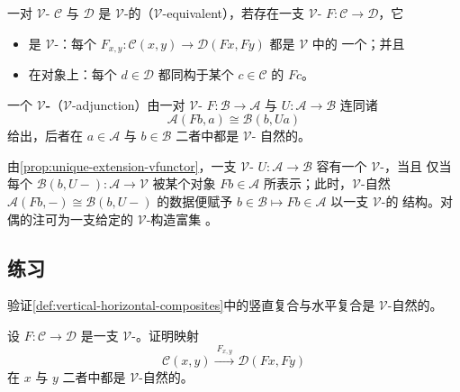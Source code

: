 \begin{definition}\label{def:vequivalent}
一对 $\mathcal{V}$-\trCategory{} $\mathcal{C}$ 与 $\mathcal{D}$ 是
$\mathcal{V}$-\textbf{\trEquivalence}的（$\mathcal{V}$-equivalent），若存在一支
$\mathcal{V}$-\trFunctor{} $F\colon\mathcal{C}\to\mathcal{D}$，它
\begin{itemize}
\item 是 $\mathcal{V}$-\textbf{\trFullyFaithful}：每个
  $F_{x,y}\colon\mathcal{C}(x,y)\to\mathcal{D}(Fx,Fy)$ 都是 $\mathcal{V}$ 中的
  一个\trIsomorphism；并且
\item 在对象上\trEssentiallySurjective：每个 $d\in\mathcal{D}$ 都同构于某个
  $c\in\mathcal{C}$ 的 $Fc$。
\end{itemize}
\end{definition}

\begin{definition}\label{def:vadjunction}
一个 $\mathcal{V}$\textbf{-\trAdjunction}（$\mathcal{V}$-adjunction）由一对
$\mathcal{V}$-\trFunctor{} $F\colon\mathcal{B}\to\mathcal{A}$ 与
$U\colon\mathcal{A}\to\mathcal{B}$ 连同诸\trIsomorphism
\[ \mathcal{A}(Fb,a)\cong\mathcal{B}(b,Ua) \]
给出，后者在 $a\in\mathcal{A}$ 与 $b\in\mathcal{B}$ 二者中都是 $\mathcal{V}$-%
自然的。
\end{definition}

\begin{remark}\label{rem:vleft-adjoint-representability}
由\cref{prop:unique-extension-vfunctor}，一支 $\mathcal{V}$-\trFunctor{}
$U\colon\mathcal{A}\to\mathcal{B}$ 容有一个 $\mathcal{V}$-\trLeftAdjoint，当且
仅当每个 $\mathcal{B}(b,U-)\colon\mathcal{A}\to\mathcal{V}$ 被某个对象
$Fb\in\mathcal{A}$ 所表示；此时，$\mathcal{V}$-自然\trIsomorphism{}
$\mathcal{A}(Fb,-)\cong\mathcal{B}(b,U-)$ 的数据便赋予
$b\in\mathcal{B}\mapsto Fb\in\mathcal{A}$ 以一支 $\mathcal{V}$-\trFunctor{}的
结构。对偶的注可为一支给定的 $\mathcal{V}$-\trFunctor{}构造富集%
\trRightAdjoint。
\end{remark}

\subsection*{练习}

\begin{exercise}\label{ex:vertical-horizontal-vnatural}
验证\cref{def:vertical-horizontal-composites}中的竖直复合与水平复合是
$\mathcal{V}$-自然的。
\end{exercise}

\begin{exercise}\label{ex:functor-arrow-vnatural}
设 $F\colon\mathcal{C}\to\mathcal{D}$ 是一支 $\mathcal{V}$-\trFunctor。证明映射
\[ \mathcal{C}(x,y)\xrightarrow{\ F_{x,y}\ }\mathcal{D}(Fx,Fy) \]
在 $x$ 与 $y$ 二者中都是 $\mathcal{V}$-自然的。
\end{exercise}

